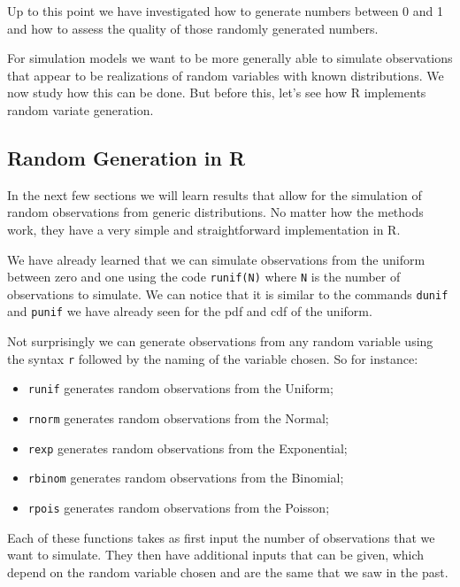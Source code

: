 \documentclass[
]{book}
\begin{document}
Up to this point we have investigated how to generate numbers between 0 and 1 and how to assess the quality of those randomly generated numbers.

For simulation models we want to be more generally able to simulate observations that appear to be realizations of random variables with known distributions. We now study how this can be done. But before this, let's see how R implements random variate generation.

\hypertarget{random-generation-in-r}{%
\subsection{Random Generation in R}\label{random-generation-in-r}}

In the next few sections we will learn results that allow for the simulation of random observations from generic distributions. No matter how the methods work, they have a very simple and straightforward implementation in R.

We have already learned that we can simulate observations from the uniform between zero and one using the code \texttt{runif(N)} where \texttt{N} is the number of observations to simulate. We can notice that it is similar to the commands \texttt{dunif} and \texttt{punif} we have already seen for the pdf and cdf of the uniform.

Not surprisingly we can generate observations from any random variable using the syntax \texttt{r} followed by the naming of the variable chosen. So for instance:

\begin{itemize}
\item
  \texttt{runif} generates random observations from the Uniform;
\item
  \texttt{rnorm} generates random observations from the Normal;
\item
  \texttt{rexp} generates random observations from the Exponential;
\item
  \texttt{rbinom} generates random observations from the Binomial;
\item
  \texttt{rpois} generates random observations from the Poisson;
\end{itemize}

Each of these functions takes as first input the number of observations that we want to simulate. They then have additional inputs that can be given, which depend on the random variable chosen and are the same that we saw in the past.
\end{document}

